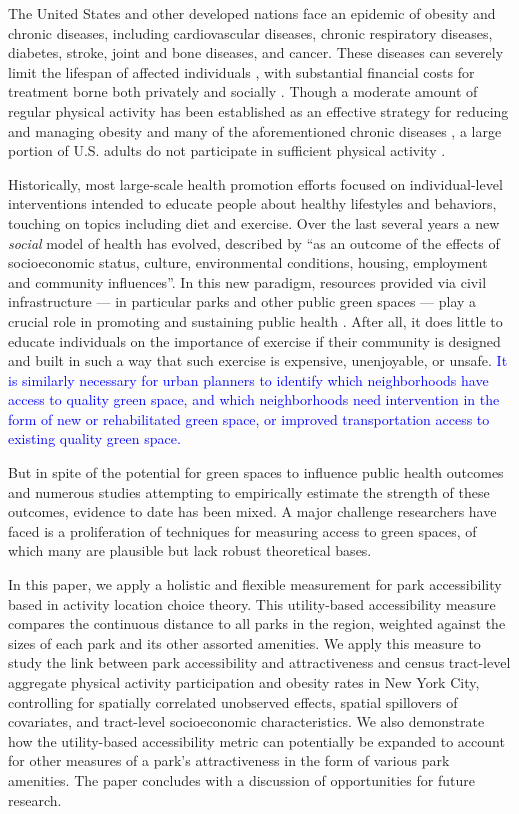 \documentclass[shortAfour,sageh.bst]{sagej}
\begin{document}
The United States and other developed nations face an epidemic of
obesity and chronic diseases, including cardiovascular diseases, chronic
respiratory diseases, diabetes, stroke, joint and bone diseases, and
cancer. These diseases can severely limit the lifespan of affected
individuals \citep{WHO2014}, with substantial financial costs for
treatment borne both privately and socially \citep{Finkelstein2009}.
Though a moderate amount of regular physical activity has been
established as an effective strategy for reducing and managing obesity
and many of the aforementioned chronic diseases
\citep{CDC2009, Durstine2013}, a large portion of U.S. adults do not
participate in sufficient physical activity \citep{Wolf2008}.

Historically, most large-scale health promotion efforts focused on
individual-level interventions intended to educate people about healthy
lifestyles and behaviors, touching on topics including diet and
exercise. Over the last several years a new \emph{social} model of
health has evolved, described by \citet{Duhl1999} ``as an outcome of the
effects of socioeconomic status, culture, environmental conditions,
housing, employment and community
influences''\citeyearpar[p.7]{Duhl1999}. In this new paradigm, resources
provided via civil infrastructure --- in particular parks and other
public green spaces --- play a crucial role in promoting and sustaining
public health \citep{Bedimo-Rung2005, Wells2007, Coutts2008}. After all,
it does little to educate individuals on the importance of exercise if
their community is designed and built in such a way that such exercise
is expensive, unenjoyable, or unsafe. \textcolor{blue}{It is similarly necessary for
urban planners to identify which neighborhoods have access to quality
green space, and which neighborhoods need intervention in the form of
new or rehabilitated green space, or improved transportation access to
existing quality green space.}

But in spite of the potential for green spaces to influence public
health outcomes and numerous studies attempting to empirically estimate
the strength of these outcomes, evidence to date has been mixed. A major
challenge researchers have faced is a proliferation of techniques for
measuring access to green spaces, of which many are plausible but lack
robust theoretical bases.

In this paper, we apply a holistic and flexible measurement for park
accessibility based in activity location choice theory. This
utility-based accessibility measure compares the continuous distance to
all parks in the region, weighted against the sizes of each park and its
other assorted amenities. We apply this measure to study the link
between park accessibility and attractiveness and census tract-level
aggregate physical activity participation and obesity rates in New York
City, controlling for spatially correlated unobserved effects, spatial
spillovers of covariates, and tract-level socioeconomic characteristics.
We also demonstrate how the utility-based accessibility metric can
potentially be expanded to account for other measures of a park's
attractiveness in the form of various park amenities. The paper
concludes with a discussion of opportunities for future research.
\end{document}

